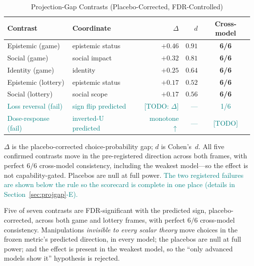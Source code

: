 \documentclass[journal]{IEEEtran}
\newcommand{\rev}[1]{\textcolor{teal}{#1}}
\begin{document}
\begin{table}[!t]
\renewcommand{\arraystretch}{1.15}
\caption{Projection-Gap Contrasts (Placebo-Corrected, FDR-Controlled)}
\label{tab:projgap}
\centering
\footnotesize
\begin{tabular}{@{}l l r r c@{}}
\toprule
\textbf{Contrast} & \textbf{Coordinate} & \textbf{$\Delta$} & \textbf{$d$} & \textbf{Cross-model} \\
\midrule
Epistemic (game)    & epistemic status & $+0.46$ & $0.91$ & \textbf{6/6} \\
Social (game)       & social impact    & $+0.32$ & $0.81$ & \textbf{6/6} \\
Identity (game)     & identity         & $+0.25$ & $0.64$ & \textbf{6/6} \\
Epistemic (lottery) & epistemic status & $+0.17$ & $0.52$ & \textbf{6/6} \\
Social (lottery)    & social scope     & $+0.17$ & $0.56$ & \textbf{6/6} \\
\midrule %
\rev{Loss reversal (fail)}   & \rev{sign flip predicted} & \rev{[TODO: $\Delta$]} & \rev{---} & \rev{1/6} \\
\rev{Dose-response (fail)}   & \rev{inverted-U predicted} & \rev{monotone $\uparrow$} & \rev{---} & \rev{[TODO]} \\
\bottomrule
\end{tabular}
\begin{flushleft}
\footnotesize{$\Delta$ is the placebo-corrected choice-probability gap; $d$ is Cohen's~$d$. All five confirmed contrasts move in the pre-registered direction across both frames, with perfect $6/6$ cross-model consistency, including the weakest model---so the effect is not capability-gated. Placebos are null at full power. \rev{The two registered failures are shown below the rule so the scorecard is complete in one place (details in Section~\ref{sec:projgap}-E).}}
\end{flushleft}
\end{table}

Five of seven contrasts are FDR-significant with the predicted sign, placebo-corrected, across both game and lottery frames, with perfect $6/6$ cross-model consistency.
Manipulations \emph{invisible to every scalar theory} move choices in the frozen metric's predicted direction, in every model; the placebos are null at full power; and the effect is present in the weakest model, so the ``only advanced models show it'' hypothesis is rejected.
\end{document}
